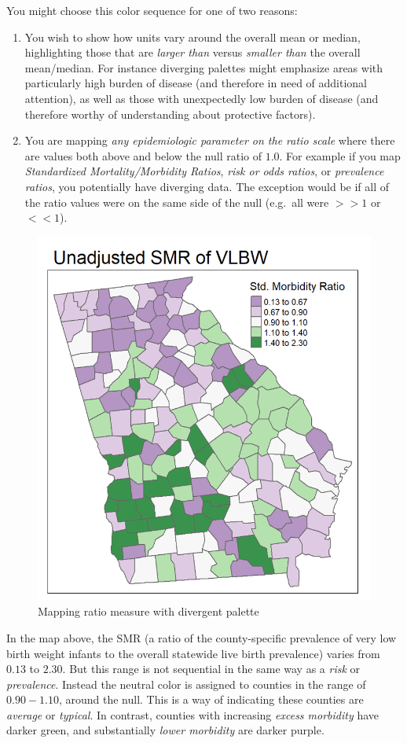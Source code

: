 \documentclass[
]{book}
\providecommand{\tightlist}{%
  \setlength{\itemsep}{0pt}\setlength{\parskip}{0pt}}
\begin{document}
You might choose this color sequence for one of two reasons:

\begin{enumerate}
\def\labelenumi{\arabic{enumi}.}
\tightlist
\item
  You wish to show how units vary around the overall mean or median, highlighting those that are \emph{larger than} versus \emph{smaller than} the overall mean/median. For instance diverging palettes might emphasize areas with particularly high burden of disease (and therefore in need of additional attention), as well as those with unexpectedly low burden of disease (and therefore worthy of understanding about protective factors).
\item
  You are mapping \emph{any epidemiologic parameter on the ratio scale} where there are values both above and below the null ratio of \(1.0\). For example if you map \emph{Standardized Mortality/Morbidity Ratios}, \emph{risk or odds ratios}, or \emph{prevalence ratios}, you potentially have diverging data. The exception would be if all of the ratio values were on the same side of the null (e.g.~all were \(>>1\) or \(<<1\)).
\end{enumerate}

\begin{figure}
\includegraphics[width=0.5\linewidth]{images/diverge-smr} \caption{Mapping ratio measure with divergent palette}\label{fig:unnamed-chunk-32}
\end{figure}

In the map above, the SMR (a ratio of the county-specific prevalence of very low birth weight infants to the overall statewide live birth prevalence) varies from \(0.13\) to \(2.30\). But this range is not sequential in the same way as a \emph{risk} or \emph{prevalence}. Instead the neutral color is assigned to counties in the range of \(0.90-1.10\), around the null. This is a way of indicating these counties are \emph{average} or \emph{typical}. In contrast, counties with increasing \emph{excess morbidity} have darker green, and substantially \emph{lower morbidity} are darker purple.
\end{document}
